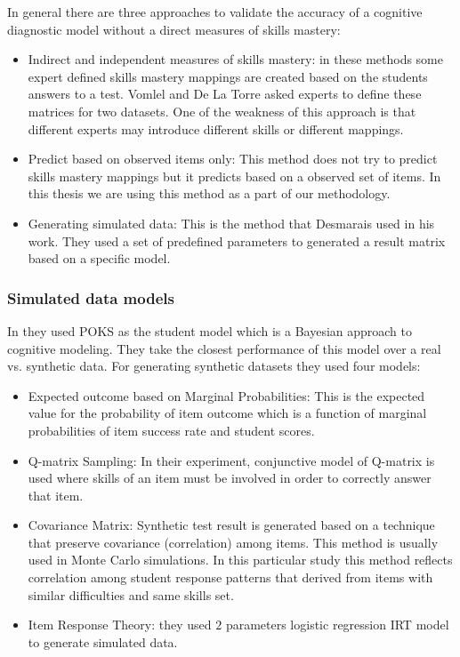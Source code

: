 In general there are three approaches to validate the accuracy of a cognitive diagnostic model without a direct measures of skills mastery:

\begin{itemize}
\item Indirect and independent measures of skills mastery: in these methods some expert defined skills mastery mappings are created based on the students answers to a test. Vomlel \citep{vomlel:2004} and De La Torre \citep{delaTorre2008} asked experts to define these matrices for two datasets. One of the weakness of this approach is that different experts may introduce different skills or different mappings.

\item Predict based on observed items only: This method does not try to predict skills mastery mappings but it predicts based on a observed set of items. In this thesis we are using this method as a part of our methodology.

\item Generating simulated data: This is the method that Desmarais \citep{Desmarais2010} used in his work. They used a set of predefined parameters to generated a result matrix based on a specific model.

\end{itemize}
\subsubsection{Simulated data models}

In \citep{Desmarais2010} they used POKS as the student model which is a Bayesian approach to cognitive modeling. They take the closest performance of this model over a real vs. synthetic data. For generating synthetic datasets they used four models:

\begin{itemize}
\item Expected outcome based on Marginal Probabilities: This is the expected value for the probability of item outcome which is a function of marginal probabilities of item success rate and student scores.
\item Q-matrix Sampling: In their experiment, conjunctive model of Q-matrix is used where skills of an item must be involved in order to correctly answer that item.
\item Covariance Matrix: Synthetic test result is generated based on a technique that preserve covariance (correlation) among items. This method is usually used in Monte Carlo simulations. In this particular study this method reflects correlation among student response patterns that derived from items with similar difficulties and same skills set.
\item Item Response Theory: they used $2$ parameters logistic regression IRT model to generate simulated data.

\end{itemize}

